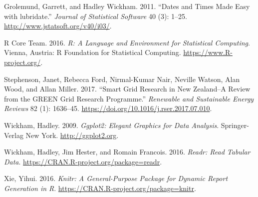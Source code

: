 \documentclass[]{article}
\theoremstyle{definition}
\theoremstyle{definition}
\theoremstyle{definition}
\theoremstyle{remark}
\begin{document}
\hypertarget{ref-lubridate}{}
Grolemund, Garrett, and Hadley Wickham. 2011. ``Dates and Times Made
Easy with lubridate.'' \emph{Journal of Statistical Software} 40 (3):
1--25. \url{http://www.jstatsoft.org/v40/i03/}.

\hypertarget{ref-baseR}{}
R Core Team. 2016. \emph{R: A Language and Environment for Statistical
Computing}. Vienna, Austria: R Foundation for Statistical Computing.
\url{https://www.R-project.org/}.

\hypertarget{ref-stephenson_smart_2017}{}
Stephenson, Janet, Rebecca Ford, Nirmal-Kumar Nair, Neville Watson, Alan
Wood, and Allan Miller. 2017. ``Smart Grid Research in New Zealand--A
Review from the GREEN Grid Research Programme.'' \emph{Renewable and
Sustainable Energy Reviews} 82 (1): 1636--45.
\url{https://doi.org/10.1016/j.rser.2017.07.010}.

\hypertarget{ref-ggplot2}{}
Wickham, Hadley. 2009. \emph{Ggplot2: Elegant Graphics for Data
Analysis}. Springer-Verlag New York. \url{http://ggplot2.org}.

\hypertarget{ref-readr}{}
Wickham, Hadley, Jim Hester, and Romain Francois. 2016. \emph{Readr:
Read Tabular Data}. \url{https://CRAN.R-project.org/package=readr}.

\hypertarget{ref-knitr}{}
Xie, Yihui. 2016. \emph{Knitr: A General-Purpose Package for Dynamic
Report Generation in R}. \url{https://CRAN.R-project.org/package=knitr}.
\end{document}
